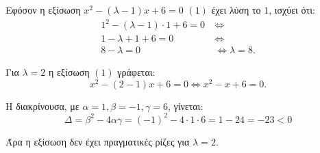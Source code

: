 
\begin{alist}
\item Εφόσον η εξίσωση $x^2 - (\lambda - 1)x + 6 = 0$ $(1)$ έχει λύση το $1$, ισχύει ότι:
\begin{align*}
1^2 - (\lambda - 1) \cdot 1 + 6 = 0 \ &\Leftrightarrow \\
1 - \lambda + 1 + 6 = 0 \ &\Leftrightarrow \\
8 - \lambda = 0 &\Leftrightarrow \lambda = 8.
\end{align*}

\item Για $\lambda = 2$ η εξίσωση $(1)$ γράφεται:
\[x^2 - (2 - 1)x + 6 = 0 \Leftrightarrow x^2 - x + 6 = 0.\]

Η διακρίνουσα, με $\alpha = 1, \beta = -1, \gamma = 6$, γίνεται:
\[\Delta = \beta^2 - 4\alpha\gamma = (-1)^2 - 4 \cdot 1 \cdot 6 = 1 - 24 = -23 < 0\]

Άρα η εξίσωση δεν έχει πραγματικές ρίζες για $\lambda = 2$.
\end{alist}

